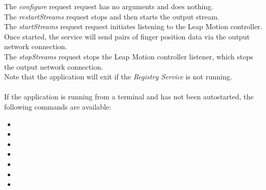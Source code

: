 The \emph{configure} request request has no arguments and does nothing.\\

The \emph{restartStreams} request stops and then starts the output stream.\\

The \emph{startStreams} request request initiates listening to the Leap Motion controller.
Once started, the service will send pairs of finger position data via the output \yarp{}
network connection.\\

The \emph{stopStreams} request stops the Leap Motion controller listener, which stops the
output \yarp{} network connection.\\ 

Note that the application will exit if the \emph{Registry Service} is not running.\\

\insertAppParameters{}
\insertTagDescription{\TFI}
\insertInputServiceComment{}\\

If the application is running from a terminal and has not been autostarted, the following
commands are available:
\begin{itemize}
\item{}
\item\exSp{}
\item\exSp{}
\item\exSp{}
\item\exSp{}
\item\exSp{}
\item\exSp{}
\end{itemize}
\primaryEnd{}
